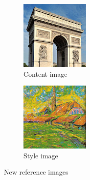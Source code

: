 \documentclass[twocolumn,superscriptaddress,aps, floatfix]{revtex4-1}
\begin{document}
    \begin{figure}[ht]
        \centering
        \begin{subfigure}[b]{0.22\textwidth}
            \centering
            \includegraphics[width=\textwidth]{resources/png/inputs/paris.png}
            \caption{Content image}
        \end{subfigure}
        \hfill
        \begin{subfigure}[b]{0.22\textwidth}
            \centering
            \includegraphics[width=\textwidth]{resources/png/inputs/church.png}
            \caption{Style image}
            \label{added.layers.ref.style}
        \end{subfigure}
        \caption{New reference images}
    \end{figure}
    
\end{document}
